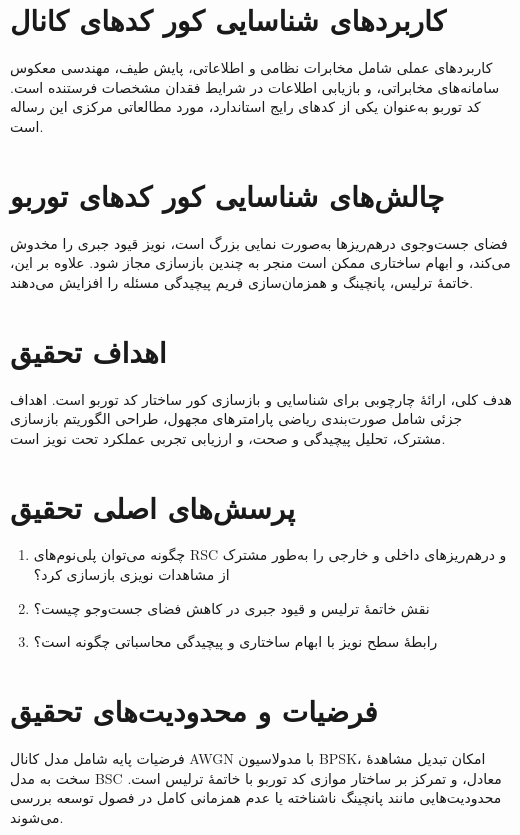 \section{کاربردهای شناسایی کور کدهای کانال}
کاربردهای عملی شامل مخابرات نظامی و اطلاعاتی، پایش طیف، مهندسی معکوس سامانه‌های مخابراتی، و بازیابی اطلاعات در شرایط فقدان مشخصات فرستنده است. کد توربو به‌عنوان یکی از کدهای رایج استاندارد، مورد مطالعاتی مرکزی این رساله است.

\section{چالش‌های شناسایی کور کدهای توربو}
فضای جست‌وجوی درهم‌ریزها به‌صورت نمایی بزرگ است، نویز قیود جبری را مخدوش می‌کند، و ابهام ساختاری ممکن است منجر به چندین بازسازی مجاز شود. علاوه بر این، خاتمهٔ ترلیس، پانچینگ و همزمان‌سازی فریم پیچیدگی مسئله را افزایش می‌دهند.

\section{اهداف تحقیق}
هدف کلی، ارائهٔ چارچوبی برای شناسایی و بازسازی کور ساختار کد توربو است. اهداف جزئی شامل صورت‌بندی ریاضی پارامترهای مجهول، طراحی الگوریتم بازسازی مشترک، تحلیل پیچیدگی و صحت، و ارزیابی تجربی عملکرد تحت نویز است.

\section{پرسش‌های اصلی تحقیق}
\begin{enumerate}
	\item چگونه می‌توان پلی‌نوم‌های RSC و درهم‌ریزهای داخلی و خارجی را به‌طور مشترک از مشاهدات نویزی بازسازی کرد؟
	\item نقش خاتمهٔ ترلیس و قیود جبری در کاهش فضای جست‌وجو چیست؟
	\item رابطهٔ سطح نویز با ابهام ساختاری و پیچیدگی محاسباتی چگونه است؟
\end{enumerate}

\section{فرضیات و محدودیت‌های تحقیق}
فرضیات پایه شامل مدل کانال AWGN با مدولاسیون BPSK، امکان تبدیل مشاهدهٔ سخت به مدل BSC معادل، و تمرکز بر ساختار موازی کد توربو با خاتمهٔ ترلیس است. محدودیت‌هایی مانند پانچینگ ناشناخته یا عدم همزمانی کامل در فصول توسعه بررسی می‌شوند.

